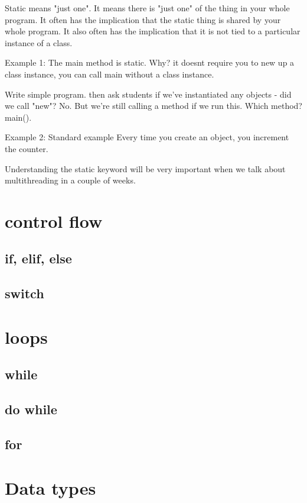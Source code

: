 \documentclass[12pt,a4paper]{article}
\begin{document}
Static means "just one". It means there is "just one" of the thing in your whole
program. It often has the implication that the static thing is shared by your
whole program. It also often has the implication that it is not tied to a
particular instance of a class. 


Example 1: The main method is static. Why? it doesnt require you to new up a
class instance, you can call main without a class instance.

Write simple program. then ask students if we've instantiated any objects - did
we call "new"? No. But we're still calling a method if we run this. Which
method? main().

Example 2: Standard example
Every time you create an object, you increment the counter.

Understanding the static keyword will be very important when we talk about
multithreading in a couple of weeks.

\section{control flow}

\subsection{if, elif, else}

\subsection{switch}

\section{loops}
\subsection{while}

\subsection{do while}

\subsection{for}
 
\section{Data types}
\end{document}
